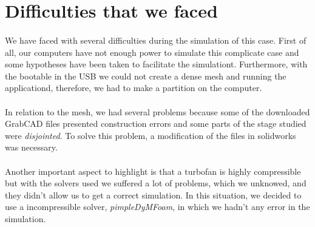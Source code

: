 \section{Difficulties that we faced}

\paragraph{}We have faced with several difficulties during the simulation of this case. First of all, our computers have not enough power to simulate this complicate case and some hypotheses have been taken to facilitate the simulationt. Furthermore, with the bootable in the USB we could not create a dense mesh and running the applicationd, therefore, we had to make a partition on the computer.

\paragraph{}In relation to the mesh, we had several problems because some of the downloaded GrabCAD files presented construction errors and some parts of the stage studied were \textit{disjointed}. To solve this problem, a modification of the files in solidworks was necessary.

\paragraph{}Another important aspect to highlight is that a turbofan is highly compressible but with the solvers used we suffered a lot of problems, which we unknowed, and they didn't allow us to get a correct simulation. In this situation, we decided to use a incompressible solver, \textit{pimpleDyMFoam}, in which we hadn't any error in the simulation.

\paragraph{}